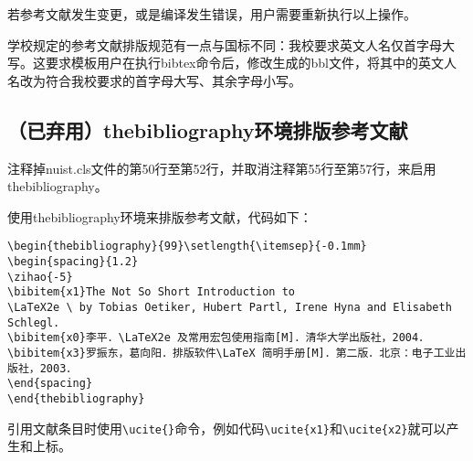 若参考文献发生变更，或是编译发生错误，用户需要重新执行以上操作。

学校规定的参考文献排版规范有一点与国标不同：我校要求英文人名仅首字母大写。这要求模板用户在执行bibtex命令后，修改生成的bbl文件，将其中的英文人名改为符合我校要求的首字母大写、其余字母小写。

\subsection{（已弃用）thebibliography环境排版参考文献}
注释掉nuist.cls文件的第50行至第52行，并取消注释第55行至第57行，来启用thebibliography。

使用thebibliography环境来排版参考文献，代码如下：
{\color{green!50!black}
\begin{lstlisting}[breaklines=true,]
\begin{thebibliography}{99}\setlength{\itemsep}{-0.1mm}
\begin{spacing}{1.2}
\zihao{-5}
\bibitem{x1}The Not So Short Introduction to 
\LaTeX2e \ by Tobias Oetiker, Hubert Partl, Irene Hyna and Elisabeth Schlegl.
\bibitem{x0}李平．\LaTeX2e 及常用宏包使用指南[M]．清华大学出版社，2004．
\bibitem{x3}罗振东，葛向阳．排版软件\LaTeX 简明手册[M]．第二版．北京：电子工业出版社，2003．
\end{spacing}
\end{thebibliography}
\end{lstlisting}
}
引用文献条目时使用\verb|\ucite{}|命令，例如代码\verb|\ucite{x1}|和\verb|\ucite{x2}|就可以产生\cite{x1}和\cite{x2}上标。